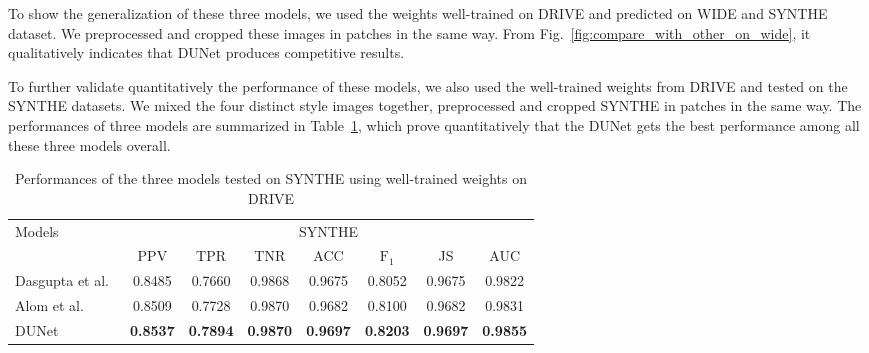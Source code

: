\documentclass[journal]{IEEEtran}
\begin{document}
To show the generalization of these three models, we used the weights well-trained on DRIVE and predicted on WIDE and SYNTHE dataset. We preprocessed and cropped these images in patches in the same way. From Fig.~\ref{fig:compare_with_other_on_wide}, it qualitatively indicates that DUNet produces competitive results. 

To further validate quantitatively the performance of these models, we also used the well-trained weights from DRIVE and tested on the SYNTHE datasets. We mixed the four distinct style images together, preprocessed and cropped SYNTHE in patches in the same way. The performances of three models are summarized in Table~\ref{table:SYNTHE_performance}, which prove quantitatively that the DUNet gets the best performance among all these three models overall. 

\begin{table}[]
\caption{Performances of the three models tested on SYNTHE using well-trained weights on DRIVE}
\renewcommand\arraystretch{1.3}      
\renewcommand\tabcolsep{1.5pt} 
\begin{center}
\begin{tabular}{lccccccc}
\toprule
\multirow{2}{*}{Models} & \multicolumn{7}{c}{SYNTHE}                                                                                                  \\ \cline{2-8} 
                        & PPV             & TPR             & TNR             & ACC             & $\mathrm{F_{1}}$              & JS              & AUC             \\ \hline
 Dasgupta et al.~\cite{dasgupta_fully_2017}       & 0.8485          & 0.7660         & 0.9868          & 0.9675          & 0.8052          & 0.9675          & 0.9822          \\ 
Alom et al.~\cite{alom_recurrent_2018}                   & 0.8509 & 0.7728          & 0.9870 & 0.9682          & 0.8100           & 0.9682          & 0.9831          \\
DUNet                   & \textbf{0.8537}          & \textbf{0.7894} & \textbf{0.9870}          & \textbf{0.9697} & \textbf{0.8203} & \textbf{0.9697} & \textbf{0.9855} \\
\bottomrule
\end{tabular}
\end{center}
\label{table:SYNTHE_performance}
\end{table}
\end{document}

